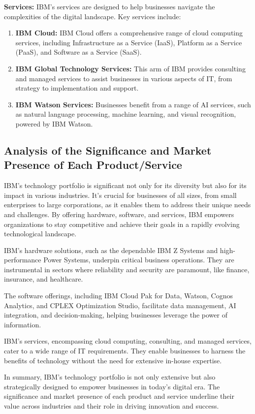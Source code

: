 \textbf{Services:} IBM's services are designed to help businesses navigate the complexities of the digital landscape. Key services include:

\begin{enumerate}
  \item \textbf{IBM Cloud:} IBM Cloud offers a comprehensive range of cloud computing services, including Infrastructure as a Service (IaaS), Platform as a Service (PaaS), and Software as a Service (SaaS).
  
  \item \textbf{IBM Global Technology Services:} This arm of IBM provides consulting and managed services to assist businesses in various aspects of IT, from strategy to implementation and support.
  
  \item \textbf{IBM Watson Services:} Businesses benefit from a range of AI services, such as natural language processing, machine learning, and visual recognition, powered by IBM Watson.
\end{enumerate}

\subsection{Analysis of the Significance and Market Presence of Each Product/Service}

IBM's technology portfolio is significant not only for its diversity but also for its impact in various industries. It's crucial for businesses of all sizes, from small enterprises to large corporations, as it enables them to address their unique needs and challenges. By offering hardware, software, and services, IBM empowers organizations to stay competitive and achieve their goals in a rapidly evolving technological landscape.

IBM's hardware solutions, such as the dependable IBM Z Systems and high-performance Power Systems, underpin critical business operations. They are instrumental in sectors where reliability and security are paramount, like finance, insurance, and healthcare.

The software offerings, including IBM Cloud Pak for Data, Watson, Cognos Analytics, and CPLEX Optimization Studio, facilitate data management, AI integration, and decision-making, helping businesses leverage the power of information.

IBM's services, encompassing cloud computing, consulting, and managed services, cater to a wide range of IT requirements. They enable businesses to harness the benefits of technology without the need for extensive in-house expertise.

In summary, IBM's technology portfolio is not only extensive but also strategically designed to empower businesses in today's digital era. The significance and market presence of each product and service underline their value across industries and their role in driving innovation and success.
